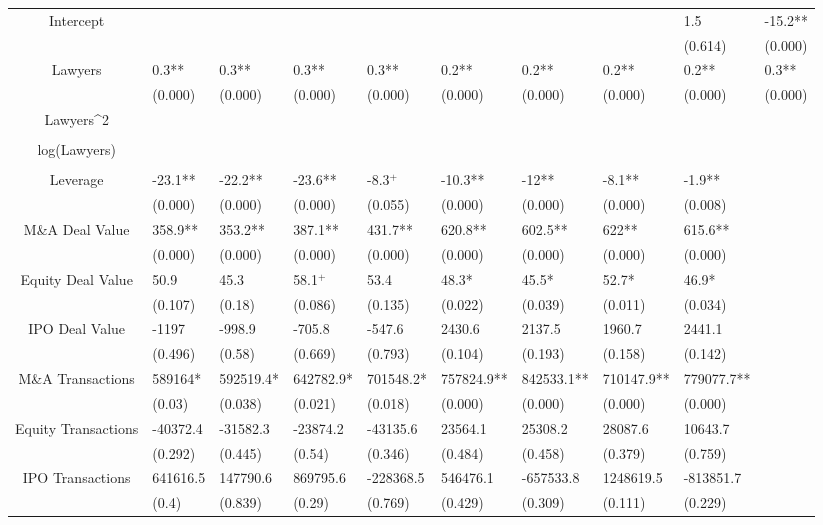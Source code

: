 \documentclass{article}
\begin{document}
\begin{table}[H]
\begin{tabular}{|clllllllll|}
Intercept &  &  &  &  &  &  &  & 1.5 & -15.2** \\ 
   &  &  &  &  &  &  &  & (0.614) & (0.000) \\ 
  Lawyers & 0.3** & 0.3** & 0.3** & 0.3** & 0.2** & 0.2** & 0.2** & 0.2** & 0.3** \\ 
   & (0.000) & (0.000) & (0.000) & (0.000) & (0.000) & (0.000) & (0.000) & (0.000) & (0.000) \\ 
  Lawyers^2 &  &  &  &  &  &  &  &  &  \\ 
   &  &  &  &  &  &  &  &  &  \\ 
  log(Lawyers) &  &  &  &  &  &  &  &  &  \\ 
   &  &  &  &  &  &  &  &  &  \\ 
  Leverage & -23.1** & -22.2** & -23.6** & -8.3$^{+}$ & -10.3** & -12** & -8.1** & -1.9** &  \\ 
   & (0.000) & (0.000) & (0.000) & (0.055) & (0.000) & (0.000) & (0.000) & (0.008) &  \\ 
  M\&A Deal Value & 358.9** & 353.2** & 387.1** & 431.7** & 620.8** & 602.5** & 622** & 615.6** &  \\ 
   & (0.000) & (0.000) & (0.000) & (0.000) & (0.000) & (0.000) & (0.000) & (0.000) &  \\ 
  Equity Deal Value & 50.9 & 45.3 & 58.1$^{+}$ & 53.4 & 48.3* & 45.5* & 52.7* & 46.9* &  \\ 
   & (0.107) & (0.18) & (0.086) & (0.135) & (0.022) & (0.039) & (0.011) & (0.034) &  \\ 
  IPO Deal Value & -1197 & -998.9 & -705.8 & -547.6 & 2430.6 & 2137.5 & 1960.7 & 2441.1 &  \\ 
   & (0.496) & (0.58) & (0.669) & (0.793) & (0.104) & (0.193) & (0.158) & (0.142) &  \\ 
  M\&A Transactions & 589164* & 592519.4* & 642782.9* & 701548.2* & 757824.9** & 842533.1** & 710147.9** & 779077.7** &  \\ 
   & (0.03) & (0.038) & (0.021) & (0.018) & (0.000) & (0.000) & (0.000) & (0.000) &  \\ 
  Equity Transactions & -40372.4 & -31582.3 & -23874.2 & -43135.6 & 23564.1 & 25308.2 & 28087.6 & 10643.7 &  \\ 
   & (0.292) & (0.445) & (0.54) & (0.346) & (0.484) & (0.458) & (0.379) & (0.759) &  \\ 
  IPO Transactions & 641616.5 & 147790.6 & 869795.6 & -228368.5 & 546476.1 & -657533.8 & 1248619.5 & -813851.7 &  \\ 
   & (0.4) & (0.839) & (0.29) & (0.769) & (0.429) & (0.309) & (0.111) & (0.229) &  \\ 

\end{tabular}
\end{table}
\end{document}
